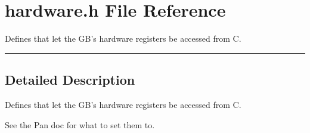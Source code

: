\section{hardware.h File Reference}
\label{hardware.h}
Defines that let the GB's hardware registers be accessed from C. 


\vspace{0.4cm}\hrule\vspace{0.2cm}
\subsection*{Detailed Description}
Defines that let the GB's hardware registers be accessed from C.

See the Pan doc for what to set them to. 